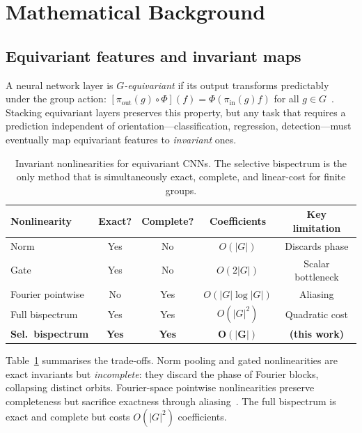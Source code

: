 \documentclass{article}
\begin{document}
\section{Mathematical Background}
\label{sec:background}

\subsection{Equivariant features and invariant maps}

A neural network layer is \emph{$G$-equivariant} if its output transforms
predictably under the group action:
$[\pi_{\mathrm{out}}(g) \circ \Phi](f) = \Phi(\pi_{\mathrm{in}}(g) f)$
for all $g \in G$~\citep{cohen2016group, weiler2019general}.
Stacking equivariant layers preserves this property, but any task that requires
a prediction independent of orientation---classification, regression,
detection---must eventually map equivariant features to \emph{invariant} ones.

\begin{table}[t]
  \caption{Invariant nonlinearities for equivariant CNNs. The selective
    bispectrum is the only method that is simultaneously exact, complete,
    and linear-cost for finite groups.}
  \label{tab:nonlinearity-comparison}
  \centering
  \small
  \begin{tabular}{lcccc}
    \toprule
    Nonlinearity & Exact? & Complete? & Coefficients & Key limitation \\
    \midrule
    Norm          & Yes & No  & $O(|G|)$      & Discards phase \\
    Gate          & Yes & No  & $O(2|G|)$     & Scalar bottleneck \\
    Fourier pointwise & No & Yes & $O(|G| \log |G|)$ & Aliasing \\
    Full bispectrum & Yes & Yes & $O(|G|^2)$  & Quadratic cost \\
    \midrule
    \textbf{Sel.\ bispectrum} & \textbf{Yes} & \textbf{Yes}
      & $\mathbf{O(|G|)}$ & \textbf{(this work)} \\
    \bottomrule
  \end{tabular}
\end{table}

Table~\ref{tab:nonlinearity-comparison} summarises the trade-offs. Norm
pooling and gated nonlinearities are exact invariants but \emph{incomplete}:
they discard the phase of Fourier blocks, collapsing distinct orbits.
Fourier-space pointwise nonlinearities preserve completeness but
sacrifice exactness through aliasing~\citep{weiler2019general}. The full
bispectrum is exact and complete but costs $O(|G|^2)$ coefficients.
\end{document}
